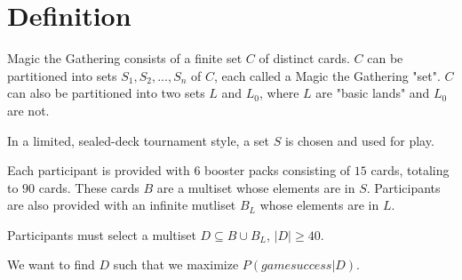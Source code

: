 \documentclass[12pt,letterpaper]{report}
\begin{document}
\section{Definition}

Magic the Gathering consists of a finite set \(C\) of distinct cards.
\(C\) can be partitioned into sets \(S_1, S_2, ..., S_n\) of \(C\), each called a Magic the Gathering "set".
\(C\) can also be partitioned into two sets \(L\) and \(L_0\), where \(L\) are "basic lands" and \(L_0\) are not.

In a limited, sealed-deck tournament style,
a set \(S\) is chosen and used for play.

Each participant is provided with 6 booster packs consisting of \(15\) cards, totaling to \(90\) cards.
These cards \(B\) are a multiset whose elements are in \(S\).
Participants are also provided with an infinite mutliset \(B_L\) whose elements are in \(L\).

Participants must select a multiset \(D \subseteq B \cup B_L\), \(|D| \ge 40\).

We want to find \(D\) such that we maximize \(P\left(game success | D\right)\).
\end{document}
